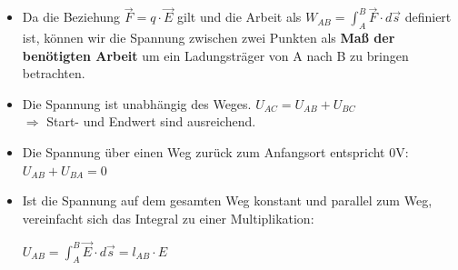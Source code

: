 \begin{itemize}

	\item	Da die Beziehung $\vec{F} =  q \cdot \vec{E} $ gilt und die Arbeit als $ W_{AB} = \int_A^B \vec{F} \cdot d\vec{s}$ definiert ist, können wir die Spannung zwischen zwei Punkten als \textbf{Maß der benötigten Arbeit} um ein Ladungsträger von A nach B zu bringen betrachten.  \\
	\item Die Spannung ist unabhängig des Weges.  $U_{AC} = U_{AB} + U_{BC}$
	      \\ $\Rightarrow$ Start- und Endwert sind ausreichend. \\
	\item Die Spannung über einen Weg zurück zum Anfangsort entspricht 0V: $U_{AB} + U_{BA} = 0$ \\
	\item Ist die Spannung auf dem gesamten Weg konstant und parallel zum Weg, vereinfacht sich das Integral zu einer Multiplikation: \\
	      \begin{center}
	      	$ U_{AB} = \int_{A}^{B} \vec{E}\cdot d\vec{s} = l_{AB} \cdot E$
	      \end{center}
\end{itemize}


\newpage
